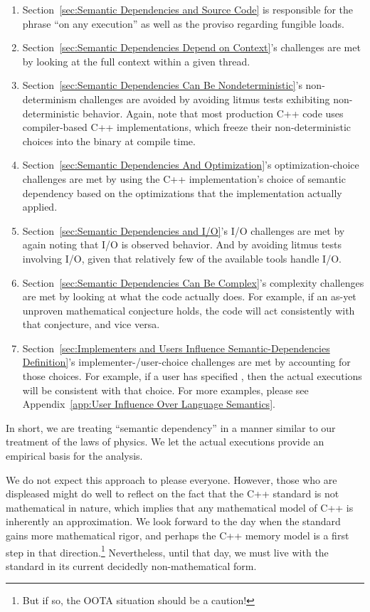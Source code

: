 \documentclass[10]{article}
\begin{document}
\begin{enumerate}
\item	Section~\ref{sec:Semantic Dependencies and Source Code}
	is responsible for the phrase ``on any execution'' as well
	as the proviso regarding fungible loads.
\item	Section~\ref{sec:Semantic Dependencies Depend on Context}'s
	challenges are met by looking at the full context within
	a given thread.
\item	Section~\ref{sec:Semantic Dependencies Can Be Nondeterministic}'s
	non-determinism challenges are avoided by avoiding litmus tests
	exhibiting non-deterministic behavior.
	Again, note that most production C++ code uses compiler-based C++
	implementations, which freeze their non-deterministic choices
	into the binary at compile time.
\item	Section~\ref{sec:Semantic Dependencies And Optimization}'s
	optimization-choice challenges are met by using the C++
	implementation's choice of semantic dependency based on the
	optimizations that the implementation actually applied.
\item	Section~\ref{sec:Semantic Dependencies and I/O}'s
	I/O challenges are met by again noting that I/O is observed
	behavior.
	And by avoiding litmus tests involving I/O, given that relatively
	few of the available tools handle I/O.
\item	Section~\ref{sec:Semantic Dependencies Can Be Complex}'s
	complexity challenges are met by looking at what the code
	actually does.
	For example, if an as-yet unproven mathematical conjecture
	holds, the code will act consistently with that conjecture,
	and vice versa.
\item	Section~\ref{sec:Implementers and Users Influence Semantic-Dependencies Definition}'s
	implementer-/user-choice challenges are met by accounting for
	those choices.
	For example, if a user has specified ,
	then the actual executions will be consistent with that choice.
	For more examples, please see
	Appendix~\ref{app:User Influence Over Language Semantics}.
\end{enumerate}

In short, we are treating ``semantic dependency'' in a manner similar
to our treatment of the laws of physics.
We let the actual executions provide an empirical basis for the analysis.

We do not expect this approach to please everyone.
However, those who are displeased might do well to reflect on the fact
that the C++ standard is not mathematical in nature, which implies that
any mathematical model of C++ is inherently an approximation.
We look forward to the day when the standard gains more mathematical
rigor, and perhaps the C++ memory model is a first step in that
direction.\footnote{
	But if so, the OOTA situation should be a caution!}
Nevertheless, until that day, we must live with the standard in its
current decidedly non-mathematical form.
\end{document}
